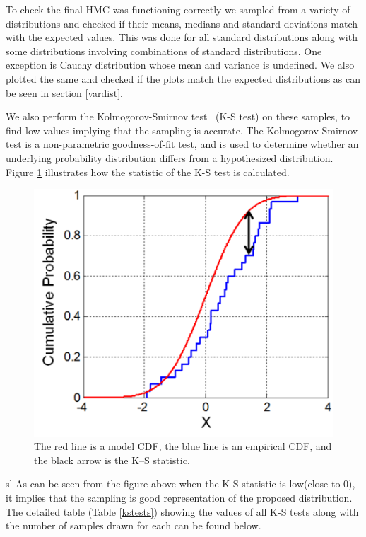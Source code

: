 \documentclass[a4paper,11pt]{article}
\theoremstyle{mytheor}
\begin{document}
        To check the final HMC was functioning correctly we sampled from a variety of distributions and checked if their means, medians and standard deviations match with the expected values. This was done for all standard distributions along with some distributions involving combinations of standard distributions. One exception is Cauchy distribution whose mean and variance is undefined. We also plotted the same and checked if the plots match the expected distributions as can be seen in section \ref{vardist}.
        
        We also perform the Kolmogorov-Smirnov test~\cite{kstest} (K-S test) on these samples, to find low values implying that the sampling is accurate. The Kolmogorov-Smirnov test is a non-parametric goodness-of-fit test, and is used to determine whether an underlying probability distribution differs from a hypothesized distribution. Figure \ref{fig:kst} illustrates how the statistic of the K-S test is calculated.
        \begin{figure}[H]
            \centering
            \includegraphics{ks.png}
            \caption{The red line is a model CDF, the blue line is an empirical CDF, and the black arrow is the K–S statistic.}
            \label{fig:kst}
        \end{figure}
        sl
        As can be seen from the figure above when the K-S statistic is low(close to 0), it implies that the sampling is good representation of the proposed distribution. The detailed table (Table \ref{kstests}) showing the values of all K-S tests along with the number of samples drawn for each can be found below. 
        
\end{document}
